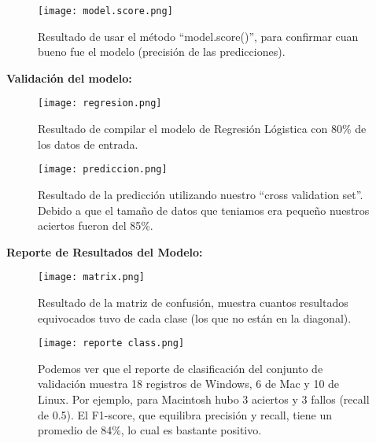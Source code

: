 \documentclass{pssbmac}
\begin{document}
\begin{figure}[H]
\centering
\texttt{[image: model.score.png]}
\caption{ {\small Resultado de usar el método ``model.score()'', para confirmar cuan bueno fue el modelo (precisión de las predicciones).}}
\label{figura08}
\end{figure}













\textbf{Validación del modelo:}

\begin{figure}[H]
\centering
\texttt{[image: regresion.png]}
\caption{ {\small Resultado de compilar el modelo de Regresión Lógistica con 80\% de los datos de entrada.}}
\label{figura09}
\end{figure}


\begin{figure}[H]
\centering
\texttt{[image: prediccion.png]}
\caption{ {\small Resultado de la predicción utilizando nuestro ``cross validation set''. Debido a que el tamaño de datos que teniamos era pequeño nuestros aciertos fueron del 85\%.}}
\label{figura10}
\end{figure}

\textbf{Reporte de Resultados del Modelo:}

\begin{figure}[H]
\centering
\texttt{[image: matrix.png]}
\caption{ {\small Resultado de la matriz de confusión, muestra cuantos resultados equivocados tuvo de cada clase (los que no están en la diagonal).}}
\label{figura11}
\end{figure}


\begin{figure}[H]
\centering
\texttt{[image: reporte class.png]}
\caption{ {\small Podemos ver que el reporte de clasificación del conjunto de validación muestra 18 registros de Windows, 6 de Mac y 10 de Linux. Por ejemplo, para Macintosh hubo 3 aciertos y 3 fallos (recall de 0.5). El F1-score, que equilibra precisión y recall, tiene un promedio de 84\%, lo cual es bastante positivo.}}
\label{figura12}
\end{figure}



\vspace{.3cm}
\end{document}
